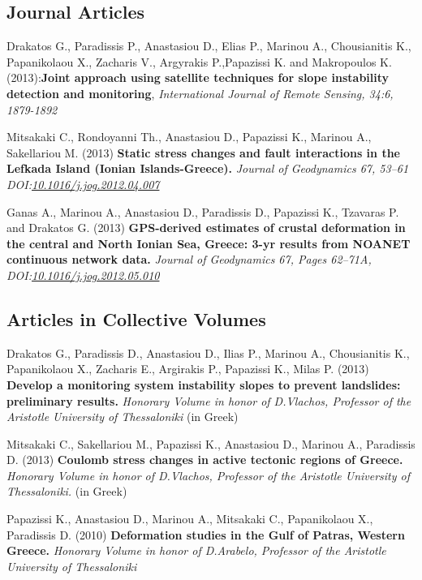 \documentclass[a4paper]{Classes/cv_prof_en} %
\begin{document}
\subsection*{Journal Articles}
\renewcommand*{\labelenumi}{J\theenumi.}
\begin{etaremune}
\item Drakatos G., Paradissis P., Anastasiou D., Elias P., Marinou A., Chousianitis K., Papanikolaou X., Zacharis V., Argyrakis P.,Papazissi K. and Makropoulos K. (2013):\textbf{Joint approach using satellite techniques for slope instability detection and monitoring}, \textit{International Journal of Remote Sensing, 34:6, 1879-1892}
\item Mitsakaki C., Rondoyanni Th., Anastasiou D., Papazissi K., Marinou A., Sakellariou M. (2013) \textbf{Static stress changes and fault interactions in the Lefkada Island (Ionian Islands-Greece).} \textit{Journal of Geodynamics 67, 53–61 DOI:\href{http://dx.doi.org/10.1016/j.jog.2012.04.007}{10.1016/j.jog.2012.04.007}}
\item Ganas A., Marinou A., Anastasiou D., Paradissis D., Papazissi K., Tzavaras P. and Drakatos G. (2013) \textbf{GPS-derived estimates of crustal deformation in the central and North Ionian Sea, Greece: 3-yr results from NOANET continuous network data.} \textit{Journal of Geodynamics 67, Pages 62–71A, DOI:\href{http://dx.doi.org/10.1016/j.jog.2012.05.010}{10.1016/j.jog.2012.05.010}}
\end{etaremune}

\subsection{Articles in Collective Volumes}
\renewcommand*{\labelenumi}{B\theenumi.}
\begin{etaremune}
\item Drakatos G., Paradissis D., Anastasiou D., Ilias P., Marinou A., Chousianitis K., Papanikolaou X., Zacharis E., Argirakis P., Papazissi K., Milas P. (2013) \textbf{Develop a monitoring system instability slopes to prevent landslides: preliminary results.} \textit{Honorary Volume in honor of D.Vlachos, Professor of the Aristotle University of Thessaloniki} (in Greek)
\item Mitsakaki C., Sakellariou M., Papazissi K., Anastasiou D., Marinou A., Paradissis D. (2013) \textbf{Coulomb stress changes in active tectonic regions of Greece.} \textit {Honorary Volume in honor of D.Vlachos, Professor of the Aristotle University of Thessaloniki.} (in Greek)
\item Papazissi K., Anastasiou D., Marinou A., Mitsakaki C., Papanikolaou X., Paradissis D. (2010) \textbf{Deformation studies in the Gulf of Patras, Western Greece.} \textit{Honorary Volume in honor of D.Arabelo, Professor of the Aristotle University of Thessaloniki}
\end{etaremune}
\end{document}
